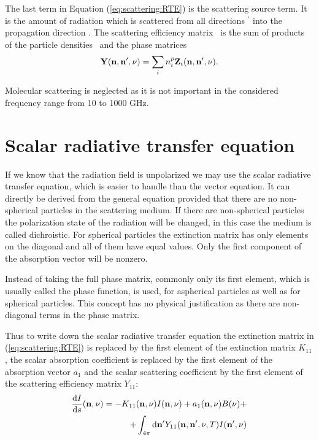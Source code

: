 The last term in Equation (\ref{eq:scattering:RTE}) is the scattering
source term. It is the amount of radiation which is scattered from all
directions \PDir$^\prime$ into the propagation direction \PDir.  The
scattering efficiency matrix \SEfMat\ is the sum of products of the
particle densities \PDen\ and the phase matrices \PhaMat
\begin{eqnarray}
{\bf Y}({\bf n}, {\bf n}', \nu) = \sum_i{n^p_i{\bf Z}_i({\bf n},
  {\bf n}', \nu)}.
\end{eqnarray}

Molecular scattering is neglected as it is not important in the
considered frequency range from 10 to 1000 GHz.


\section{Scalar radiative transfer equation}
\label{sec:scattering:scalar_rte}

If we know that the radiation field is unpolarized we may use the
scalar radiative transfer equation, which is easier to handle than the
vector equation. It can directly be derived from the general equation
provided that there are no non-spherical particles in the scattering
medium. If there are non-spherical particles the polarization state of
the radiation will be changed, in this case the medium is called
dichroistic.  For spherical particles the extinction matrix has only
elements on the diagonal and all of them have equal values. Only the
first component of the absorption vector will be nonzero.

Instead of taking the full phase matrix, commonly only its first
element, which is usually called the phase function, is used, for
aspherical particles as well as for spherical particles. This concept
has no physical justification as there are non-diagonal terms in the
phase matrix.

Thus to write down the scalar radiative transfer equation the
extinction matrix in (\ref{eq:scattering:RTE}) is replaced by the
first element of the extinction matrix $K_{11}$, the scalar absorption
coefficient is replaced by the first element of the absorption vector
$a_1$ and the scalar scattering coefficient by the first element of
the scattering efficiency matrix $Y_{11}$:
\begin{eqnarray}
  \label{eq:scattering:scalar_rte}
\frac{\mathrm{d} I}{\mathrm{d} s} ({\bf n}, \nu) = -K_{11}({\bf n}, \nu)I
({\bf n}, \nu) + a_1({\bf n}, \nu)B(\nu) + \\ \nonumber
 +\int_{4\pi} \mathrm{d} {\bf n}^\prime Y_{11}({\bf n}, {\bf n}^\prime, \nu, T) I({\bf n}^\prime,
  \nu)
\end{eqnarray}

